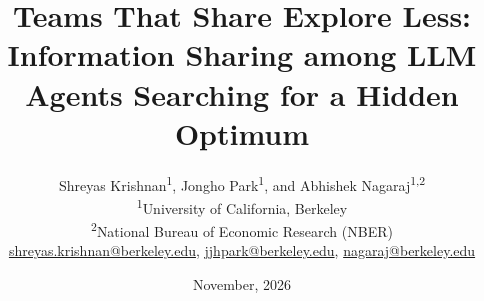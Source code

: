 \documentclass[11pt]{article}
\title{\textbf{Teams That Share Explore Less: Information Sharing among LLM Agents Searching for a Hidden Optimum}}
\author{%
Shreyas Krishnan\textsuperscript{1}, Jongho Park\textsuperscript{1}, and Abhishek Nagaraj\textsuperscript{1,2}\\[4pt]
\normalsize \textsuperscript{1}University of California, Berkeley\\
\normalsize \textsuperscript{2}National Bureau of Economic Research (NBER)\\[4pt]
\normalsize \href{mailto:shreyas.krishnan@berkeley.edu}{shreyas.krishnan@berkeley.edu},
\href{mailto:jjhpark@berkeley.edu}{jjhpark@berkeley.edu}, \href{mailto:nagaraj@berkeley.edu}{nagaraj@berkeley.edu}}
\date{November, 2026}
\begin{document}
\maketitle

\begin{abstract}

\end{abstract}










\clearpage

\end{document}
